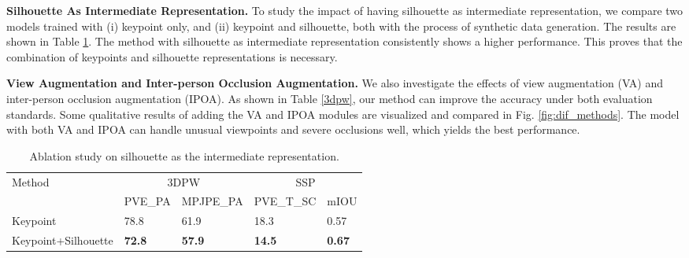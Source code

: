 \documentclass[journal]{IEEEtran}
\begin{document}
\noindent\textbf{Silhouette As Intermediate Representation.} To study the impact of having silhouette as intermediate representation, we compare two models trained with (i) keypoint only, and (ii) keypoint and silhouette, both with the process of synthetic data generation. The results are shown in Table \ref{tab:ks}. The method with silhouette as intermediate representation consistently shows a higher performance. This proves that the combination of keypoints and silhouette representations is necessary.

\noindent\textbf{View Augmentation and Inter-person Occlusion Augmentation.} We also investigate the effects of view augmentation (VA) and inter-person occlusion augmentation (IPOA). As shown in Table \ref{3dpw}, our method can improve the accuracy under both evaluation standards. Some qualitative results of adding the VA and IPOA modules are visualized and compared in Fig. \ref{fig:dif_methods}. The model with both VA and IPOA can handle unusual viewpoints and severe occlusions well, which yields the best performance.

{
\begin{table}[!htbp]
\caption{Ablation study on silhouette as the intermediate representation.}
\begin{tabular}{lllll}
\hline
\multirow{2}{*}{Method} & \multicolumn{2}{c}{3DPW}                                    & \multicolumn{2}{c}{SSP}                                   \\
                        & \multicolumn{1}{c}{PVE\_PA } & \multicolumn{1}{c}{MPJPE\_PA } & \multicolumn{1}{c}{PVE\_T\_SC} & \multicolumn{1}{c}{mIOU} \\ \cline{2-5} 
Keypoint                & 78.8                        & 61.9                          & 18.3                           & 0.57                     \\
Keypoint+Silhouette     & \textbf{72.8}               & \textbf{57.9}                 & \textbf{14.5}                  & \textbf{0.67}            \\ \hline
\end{tabular}
\label{tab:ks}
\end{table}
\vspace{-0.2cm}
}
\end{document}

